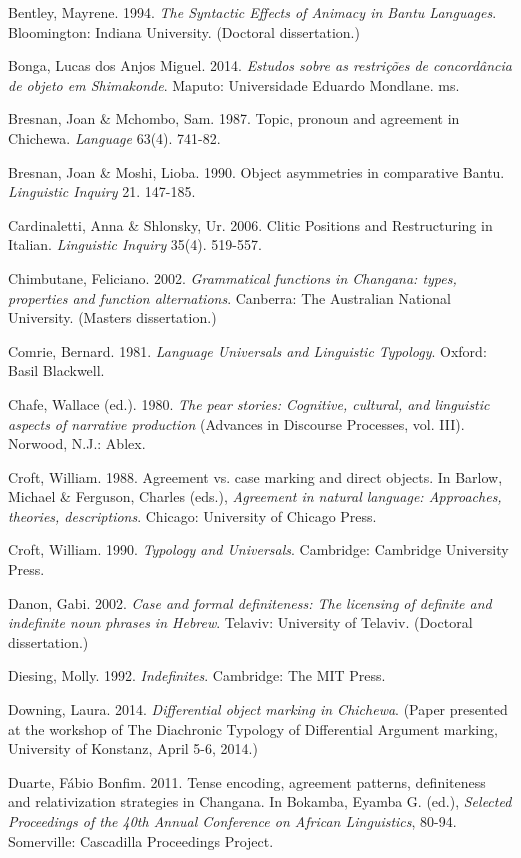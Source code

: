 \documentclass[output=paper]{langsci/langscibook}
\begin{document}
Bentley, Mayrene. 1994. {\textit{The Syntactic Effects of Animacy in Bantu Languages}}. Bloomington: Indiana University. (Doctoral dissertation.)

{Bonga, Lucas dos Anjos Miguel. 2014. }{\textit{Estudos sobre as restrições de concordância de objeto em Shimakonde}}{. Maputo: }{Universidade Eduardo Mondlane. ms.}

{Bresnan, Joan \& Mchombo, Sam. }1987. Topic, pronoun and agreement in Chichewa. {\textit{Language}} 63(4). 741-82.

Bresnan, Joan \& Moshi, Lioba. 1990. Object asymmetries in comparative Bantu. {\textit{Linguistic Inquiry}} 21. 147-185.

Cardinaletti, Anna \& Shlonsky, Ur. 2006. Clitic Positions and Restructuring in Italian. {\textit{Linguistic Inquiry}} 35(4). 519-557.

Chimbutane, Feliciano. 2002. {\textit{Grammatical functions in Changana: types, properties and function alternations}}. Canberra: The Australian National University. (Masters dissertation.)

Comrie, Bernard. 1981. {\textit{Language Universals and Linguistic Typology}}. Oxford: Basil Blackwell.

Chafe, Wallace (ed.). 1980. \textit{The pear stories: Cognitive, cultural, and linguistic aspects of narrative production} (Advances in Discourse Processes, vol. III). Norwood, N.J.: Ablex.

Croft, William. 1988. Agreement vs. case marking and direct objects. In Barlow, Michael \& Ferguson, Charles (eds.), {\textit{Agreement in natural language: Approaches, theories, descriptions}}. Chicago: University of Chicago Press.

Croft, William. 1990. {\textit{Typology and Universals}}. Cambridge: Cambridge University Press.

Danon, Gabi. 2002. {\textit{Case and formal definiteness: The licensing of definite and indefinite noun phrases in Hebrew}}. Telaviv: University of Telaviv. (Doctoral dissertation.)

Diesing, Molly. 1992. {\textit{Indefinites}}. Cambridge: The MIT Press.

Downing, Laura. 2014. {\textit{Differential object marking in Chichewa}}. (Paper presented at the workshop of The Diachronic Typology of Differential Argument marking, University of Konstanz, April 5-6, 2014.)

Duarte, Fábio Bonfim. 2011. Tense encoding, agreement patterns, definiteness and relativization strategies in Changana. In Bokamba, Eyamba G. (ed.), {\textit{Selected Proceedings of the 40th Annual Conference on African Linguistics}}, 80-94. Somerville: Cascadilla Proceedings Project.
\end{document}
